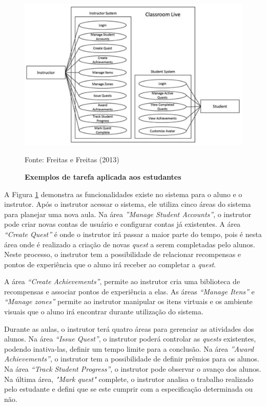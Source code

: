 \documentclass[
	12pt,				%
	oneside,			%
	a4paper,			%
	english,			%
	french,				%
	spanish,			%
	brazil,				%
	]{abntex2}
\begin{document}
\begin{figure}[ht]
\centering
\caption{\textbf{Exemplos de tarefa aplicada aos estudantes}}
\includegraphics[width=1\textwidth]{imagens/classroom_diagrama.png}

Fonte: Freitas e Freitas (2013)
\label{fig:classroom_diagrama}
\end{figure}

A Figura \ref{fig:classroom_diagrama} demonstra as funcionalidades existe no sistema para o aluno e o instrutor.
Após o instrutor acessar o sistema, ele utiliza cinco áreas do sistema para planejar uma nova aula. Na área \textit{”Manage Student Accounts”}, o instrutor pode criar novas contas de usuário e configurar contas já existentes. A área \textit{“Create Quest”} é onde o instrutor irá passar a maior parte do tempo, pois é nesta área onde é realizado a criação de novas \textit{quest} a serem completadas pelo alunos. Neste processo, o instrutor tem a possibilidade de relacionar recompensas e pontos de experiência que o aluno irá receber ao completar a \textit{quest}. 

A área \textit{“Create Achievements”}, permite ao instrutor cria uma biblioteca de recompensas e associar pontos de experiência a elas. As áreas \textit{“Manage Itens”} e \textit{“Manage zones”} permite ao instrutor manipular os itens virtuais e os ambiente visuais que o aluno irá encontrar durante utilização do sistema.

Durante as aulas, o instrutor terá quatro áreas para gerenciar as atividades dos alunos. Na área \textit{“Issue Quest”}, o instrutor poderá controlar as \textit{quests} existentes, podendo inativa-las, definir um tempo limite para a conclusão. Na área \textit{”Award Achievements”}, o instrutor tem a possibilidade de definir prêmios para os alunos. Na área \textit{“Track Student Progress”}, o instrutor pode observar o avanço dos alunos. Na última área, \textit{"Mark quest"} complete, o instrutor analisa o trabalho realizado pelo estudante e defini que se este cumprir com a especificação determinada ou não.
\end{document}
